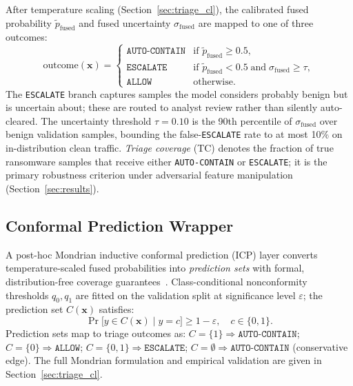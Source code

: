 \documentclass[journal]{IEEEtran}
\begin{document}
After temperature scaling (Section~\ref{sec:triage_cl}), the calibrated fused probability
$\tilde{p}_{\mathrm{fused}}$ and fused uncertainty $\sigma_{\mathrm{fused}}$ are mapped
to one of three outcomes:
\begin{equation}
\text{outcome}(\mathbf{x}) = \begin{cases}
  \texttt{AUTO-CONTAIN}   & \text{if } \tilde{p}_{\mathrm{fused}} \geq 0.5, \\
  \texttt{ESCALATE} & \text{if } \tilde{p}_{\mathrm{fused}} < 0.5 \;\text{and}\;
                      \sigma_{\mathrm{fused}} \geq \tau, \\
  \texttt{ALLOW}   & \text{otherwise.}
\end{cases}
\label{eq:triage}
\end{equation}
The \texttt{ESCALATE} branch captures samples the model considers probably benign but is
uncertain about; these are routed to analyst review rather than silently auto-cleared.
The uncertainty threshold $\tau = 0.10$ is the 90th percentile of $\sigma_{\mathrm{fused}}$
over benign validation samples, bounding the false-\texttt{ESCALATE} rate to at most 10\%
on in-distribution clean traffic.
\emph{Triage coverage} (TC) denotes the fraction of true ransomware samples that receive
either \texttt{AUTO-CONTAIN} or \texttt{ESCALATE}; it is the primary robustness criterion under
adversarial feature manipulation (Section~\ref{sec:results}).

\subsection{Conformal Prediction Wrapper}
\label{subsec:conformal_arch}

A post-hoc Mondrian inductive conformal prediction (ICP) layer converts
temperature-scaled fused probabilities into \emph{prediction sets} with formal,
distribution-free coverage guarantees~\cite{vovk_conformal_2005}.
Class-conditional nonconformity thresholds $q_0, q_1$ are fitted on the validation split
at significance level $\varepsilon$; the prediction set $C(\mathbf{x})$ satisfies:
\begin{equation}
\Pr\!\bigl[y \in C(\mathbf{x}) \mid y = c\bigr] \geq 1-\varepsilon, \quad c \in \{0,1\}.
\label{eq:coverage_arch}
\end{equation}
Prediction sets map to triage outcomes as:
$C\!=\!\{1\}\!\Rightarrow\!\texttt{AUTO-CONTAIN}$;
$C\!=\!\{0\}\!\Rightarrow\!\texttt{ALLOW}$;
$C\!=\!\{0,1\}\!\Rightarrow\!\texttt{ESCALATE}$;
$C\!=\!\emptyset\!\Rightarrow\!\texttt{AUTO-CONTAIN}$ (conservative edge).
The full Mondrian formulation and empirical validation are given in
Section~\ref{sec:triage_cl}.
\end{document}
